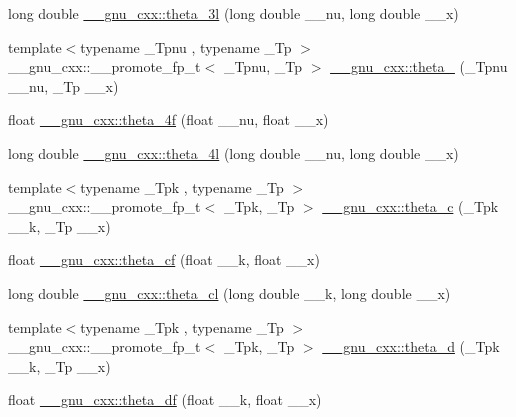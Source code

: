 \begin{DoxyCompactItemize}
\item 
long double \hyperlink{group__gnu__math__spec__func_gaf88874ff6c69940d2191f7947d2ea119}{\+\_\+\+\_\+gnu\+\_\+cxx\+::theta\+\_\+3l} (long double \+\_\+\+\_\+nu, long double \+\_\+\+\_\+x)
\item 
{\footnotesize template$<$typename \+\_\+\+Tpnu , typename \+\_\+\+Tp $>$ }\\\+\_\+\+\_\+gnu\+\_\+cxx\+::\+\_\+\+\_\+promote\+\_\+fp\+\_\+t$<$ \+\_\+\+Tpnu, \+\_\+\+Tp $>$ \hyperlink{group__gnu__math__spec__func_ga25e72f2b50b53d168f8fa653b1a0d012}{\+\_\+\+\_\+gnu\+\_\+cxx\+::theta\+\_} (\+\_\+\+Tpnu \+\_\+\+\_\+nu, \+\_\+\+Tp \+\_\+\+\_\+x)
\item 
float \hyperlink{group__gnu__math__spec__func_ga0c5cbf87e304844ed4c3423be5ca09a5}{\+\_\+\+\_\+gnu\+\_\+cxx\+::theta\+\_\+4f} (float \+\_\+\+\_\+nu, float \+\_\+\+\_\+x)
\item 
long double \hyperlink{group__gnu__math__spec__func_gaaf63a80e90cdcdd66ebb18cd3a84afae}{\+\_\+\+\_\+gnu\+\_\+cxx\+::theta\+\_\+4l} (long double \+\_\+\+\_\+nu, long double \+\_\+\+\_\+x)
\item 
{\footnotesize template$<$typename \+\_\+\+Tpk , typename \+\_\+\+Tp $>$ }\\\+\_\+\+\_\+gnu\+\_\+cxx\+::\+\_\+\+\_\+promote\+\_\+fp\+\_\+t$<$ \+\_\+\+Tpk, \+\_\+\+Tp $>$ \hyperlink{group__gnu__math__spec__func_gaa42db2270eba189b0b82c5a98c52ab9e}{\+\_\+\+\_\+gnu\+\_\+cxx\+::theta\+\_\+c} (\+\_\+\+Tpk \+\_\+\+\_\+k, \+\_\+\+Tp \+\_\+\+\_\+x)
\item 
float \hyperlink{group__gnu__math__spec__func_ga409f898afeaad5e25726ad552cfe6946}{\+\_\+\+\_\+gnu\+\_\+cxx\+::theta\+\_\+cf} (float \+\_\+\+\_\+k, float \+\_\+\+\_\+x)
\item 
long double \hyperlink{group__gnu__math__spec__func_ga0531098c628999cf396217ff997cfdda}{\+\_\+\+\_\+gnu\+\_\+cxx\+::theta\+\_\+cl} (long double \+\_\+\+\_\+k, long double \+\_\+\+\_\+x)
\item 
{\footnotesize template$<$typename \+\_\+\+Tpk , typename \+\_\+\+Tp $>$ }\\\+\_\+\+\_\+gnu\+\_\+cxx\+::\+\_\+\+\_\+promote\+\_\+fp\+\_\+t$<$ \+\_\+\+Tpk, \+\_\+\+Tp $>$ \hyperlink{group__gnu__math__spec__func_ga72e083b0e6457c928e31c590b22e728c}{\+\_\+\+\_\+gnu\+\_\+cxx\+::theta\+\_\+d} (\+\_\+\+Tpk \+\_\+\+\_\+k, \+\_\+\+Tp \+\_\+\+\_\+x)
\item 
float \hyperlink{group__gnu__math__spec__func_gad2dc6fcaf54d25cbfaad082623941118}{\+\_\+\+\_\+gnu\+\_\+cxx\+::theta\+\_\+df} (float \+\_\+\+\_\+k, float \+\_\+\+\_\+x)

\end{DoxyCompactItemize}
